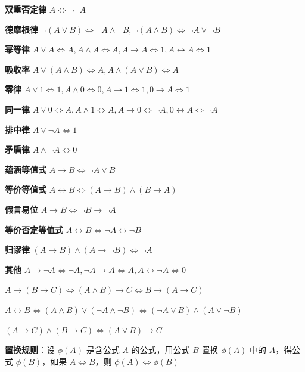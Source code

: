 \textbf{双重否定律} $A  \Leftrightarrow \neg \neg A$

\textbf{德摩根律} $\neg (A \vee B)  \Leftrightarrow \neg A \land \neg B, \neg (A \land B)  \Leftrightarrow \neg A \vee \neg B$

\textbf{幂等律} $A \vee A \Leftrightarrow A, A \land A \Leftrightarrow A, A \rightarrow A \Leftrightarrow 1, A \leftrightarrow A  \Leftrightarrow 1$

\textbf{吸收率} $A \vee (A \land B)  \Leftrightarrow A, A \land (A \vee B)  \Leftrightarrow A$

\textbf{零律} $A \vee 1  \Leftrightarrow 1, A \land 0 \Leftrightarrow 0, A \rightarrow 1 \Leftrightarrow 1, 0 \rightarrow A \Leftrightarrow 1$

\textbf{同一律} $A \vee 0  \Leftrightarrow A, A \land 1  \Leftrightarrow A, A \rightarrow 0  \Leftrightarrow \lnot A, 0 \leftrightarrow A  \Leftrightarrow \lnot A$

\textbf{排中律} $A \vee \neg A  \Leftrightarrow 1$

\textbf{矛盾律} $A \land \neg A  \Leftrightarrow 0$

\textbf{蕴涵等值式} $A \rightarrow B  \Leftrightarrow \neg A \vee B$

\textbf{等价等值式} $A \leftrightarrow B  \Leftrightarrow (A \rightarrow B) \land (B \rightarrow A)$

\textbf{假言易位} $A \rightarrow B  \Leftrightarrow \neg B \rightarrow \neg A$

\textbf{等价否定等值式} $A \leftrightarrow B  \Leftrightarrow \neg A \leftrightarrow \neg B$

\textbf{归谬律} $(A \rightarrow B) \land (A \rightarrow \neg B)  \Leftrightarrow \neg A$

\textbf{其他} $A \rightarrow \neg A  \Leftrightarrow \neg A, \neg A \rightarrow A  \Leftrightarrow A, A \leftrightarrow \neg A  \Leftrightarrow 0$

$A \rightarrow (B \rightarrow C)  \Leftrightarrow (A \land B) \rightarrow C  \Leftrightarrow B \rightarrow (A \rightarrow C)$

$A \leftrightarrow B  \Leftrightarrow (A \land B) \vee (\neg A \land \neg B)  \Leftrightarrow (\neg A \vee B) \land (A \vee \neg B)$

$(A \rightarrow C) \land (B \rightarrow C)  \Leftrightarrow (A \vee B) \rightarrow C$

\textbf{置换规则}：设 $\phi(A)$ 是含公式 $A$ 的公式，用公式 $B$ 置换 $\phi(A)$ 中的 $A$，得公式 $\phi(B)$，如果 $A  \Leftrightarrow B$，则 $\phi(A)  \Leftrightarrow \phi(B)$

